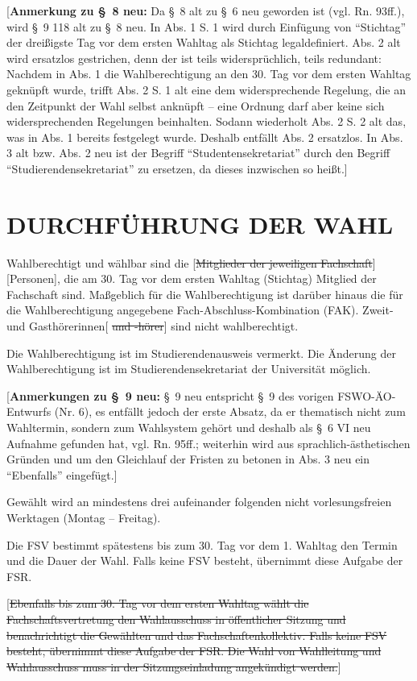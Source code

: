 \documentclass[%
draft,%
multilinesections%
]{fswo}
\newcommand\oldT[1]  {{\color{Gray}[\st{#1}]}}
\newcommand\newT[1]  {{\color{Green}[#1]}}
\newcommand\bemFr[1] {{\color{Red}[#1]}}
\newcommand\oldT[1]{}%
\newcommand\newT[1]{#1}
\newcommand\bemFr[1]{}%
\newcommand\change[2]{\oldT{#1}\newT{#2}}
\begin{document}
\bemFr{\textbf{Anmerkung zu \S~8 neu:} Da \S~8 alt zu \S~6 neu geworden ist (vgl. Rn. 93ff.), wird \S~9 118 alt zu \S~8 neu. In Abs. 1 S. 1 wird durch Einfügung von \enquote{Stichtag} der dreißigste Tag vor dem ersten Wahltag als Stichtag legaldefiniert. Abs. 2 alt wird ersatzlos gestrichen, denn der ist teils widersprüchlich, teils redundant:
Nachdem in Abs. 1 die Wahlberechtigung an den 30. Tag vor dem ersten Wahltag geknüpft wurde, trifft Abs. 2 S. 1 alt eine dem widersprechende Regelung, die an den Zeitpunkt der Wahl selbst anknüpft -- eine Ordnung darf aber keine sich widersprechenden Regelungen beinhalten.
Sodann wiederholt Abs. 2 S. 2 alt das, was in Abs. 1 bereits festgelegt wurde.
Deshalb entfällt Abs. 2 ersatzlos. In Abs. 3 alt bzw. Abs. 2 neu ist der Begriff \enquote{Studentensekretariat} durch den Begriff \enquote{Studierendensekretariat} zu ersetzen, da dieses inzwischen so heißt.}

\section{DURCHFÜHRUNG DER WAHL}

\begin{contract}
Wahlberechtigt und wählbar sind die \change{Mitglieder der jeweiligen Fachschaft}{Personen}, die am 30. Tag vor dem ersten Wahltag (Stichtag) Mitglied der Fachschaft sind.
Maßgeblich für die Wahlberechtigung ist darüber hinaus die für die Wahlberechtigung angegebene Fach-Abschluss-Kombination (FAK).
Zweit- und Gasthörerinnen\oldT{ und -hörer} sind nicht wahlberechtigt.

Die Wahlberechtigung ist im Studierendenausweis vermerkt.
Die Änderung der Wahlberechtigung ist im Studierendensekretariat der Universität möglich.
\end{contract}

\bemFr{\textbf{Anmerkungen zu \S~9 neu:}
\S~9 neu entspricht \S~9 des vorigen FSWO-ÄO-Entwurfs (Nr. 6), es entfällt jedoch der erste Absatz, da er thematisch nicht zum Wahltermin, sondern zum Wahlsystem gehört
und deshalb als \S~6 VI neu Aufnahme gefunden hat, vgl. Rn. 95ff.;
weiterhin wird aus sprachlich-ästhetischen Gründen und um den Gleichlauf der Fristen zu betonen in Abs. 3 neu ein \enquote{Ebenfalls} eingefügt.}

\begin{contract}
Gewählt wird an mindestens drei aufeinander folgenden nicht vorlesungsfreien Werktagen (Montag -- Freitag).

Die FSV bestimmt spätestens bis zum 30. Tag vor dem 1. Wahltag den Termin und die Dauer der Wahl.
Falls keine FSV besteht, übernimmt diese Aufgabe der FSR.

\oldT{Ebenfalls bis zum 30. Tag vor dem ersten Wahltag wählt die Fachschaftsvertretung den Wahlausschuss in öffentlicher Sitzung und benachrichtigt die Gewählten und das Fachschaftenkollektiv.
Falls keine FSV besteht, übernimmt diese Aufgabe der FSR.
Die Wahl von Wahlleitung und Wahlausschuss muss in der Sitzungseinladung angekündigt werden.}
\end{contract}
\end{document}
